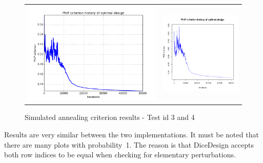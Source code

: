 \begin{figure}[!h]
\begin{center}
\begin{tabular}{>{\centering\arraybackslash}m{8cm}>{\centering\arraybackslash}m{8cm}}
 \includegraphics[scale=0.35]{otlhs_mindist_crit_big.png}   & \includegraphics[scale=0.35]{dice_mindist_crit_big.png}\\
\end{tabular}
\end{center}
\caption{Simulated annealing criterion results - Test id 3 and 4}
\label{results_sa_test_id34}
\end{figure}
Results are very similar between the two implementations.  It must be noted that there are many plots with probability~1.  The reason is that DiceDesign accepts both row indices to be equal when checking for elementary perturbations.


